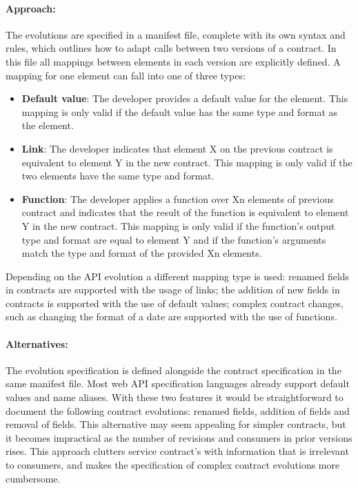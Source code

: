 \paragraph{Approach:}
The evolutions are specified in a manifest file, complete with its own syntax and rules,
which outlines how to adapt calls between two versions of a contract.
In this file all mappings between elements in each version are explicitly defined.
A mapping for one element can fall into one of three types:
\begin{itemize}
    \item \textbf{Default value}: The developer provides a default value for the element.
    This mapping is only valid if the default value has the same type and format as the element.
    \item \textbf{Link}: The developer indicates that element X on the previous contract is equivalent to element Y in the new contract.
    This mapping is only valid if the two elements have the same type and format.
    \item \textbf{Function}: The developer applies a function over Xn elements of previous contract and indicates that the result of the function is equivalent to element Y in the new contract.
    This mapping is only valid if the function's output type and format are equal to element Y and if the function's arguments match the type and format of the provided Xn elements.
\end{itemize}
Depending on the API evolution a different mapping type is used:
renamed fields in contracts are supported with the usage of links;
the addition of new fields in contracts is supported with the use of default values;
complex contract changes, such as changing the format of a date are supported with the use of functions.

\paragraph{Alternatives:}
The evolution specification is defined alongside the contract specification in the same manifest file.
Most web API specification languages already support default values and name aliases.
With these two features it would be straightforward
to document the following contract evolutions: renamed fields, addition of fields and removal of fields.
This alternative may seem appealing for simpler contracts, but it becomes impractical as the number of revisions and consumers in prior versions rises.
This approach clutters service contract's with information that is irrelevant to consumers, and makes the specification of complex contract evolutions more cumbersome.

